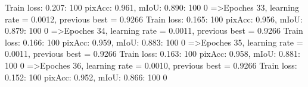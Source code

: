 Train loss: 0.207: 100%
pixAcc: 0.961, mIoU: 0.890: 100%
  0%
=>Epoches 33, learning rate = 0.0012,                 previous best = 0.9266
Train loss: 0.165: 100%
pixAcc: 0.956, mIoU: 0.879: 100%
  0%
=>Epoches 34, learning rate = 0.0011,                 previous best = 0.9266
Train loss: 0.166: 100%
pixAcc: 0.959, mIoU: 0.883: 100%
  0%
=>Epoches 35, learning rate = 0.0011,                 previous best = 0.9266
Train loss: 0.163: 100%
pixAcc: 0.958, mIoU: 0.881: 100%
  0%
=>Epoches 36, learning rate = 0.0010,                 previous best = 0.9266
Train loss: 0.152: 100%
pixAcc: 0.952, mIoU: 0.866: 100%
  0%
